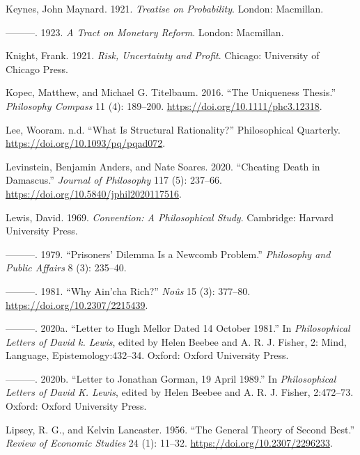 \documentclass[
  12pt,
  letterpaper,
  DIV=11,
  numbers=noendperiod]{scrreprt}
\newlength{\cslhangindent}
\newlength{\cslentryspacingunit} %
\newenvironment{CSLReferences}[2] %
 {%
  \setlength{\parindent}{0pt}
  \ifodd #1
  \let\oldpar\par
  \def\par{\hangindent=\cslhangindent\oldpar}
  \fi
  \setlength{\parskip}{#2\cslentryspacingunit}
 }%
 {}
\begin{document}
\begin{CSLReferences}{1}{0}
\leavevmode{}%
Keynes, John Maynard. 1921. \emph{Treatise on Probability}. London:
Macmillan.

\leavevmode{}%
---------. 1923. \emph{A Tract on Monetary Reform}. London: Macmillan.

\leavevmode{}%
Knight, Frank. 1921. \emph{Risk, Uncertainty and Profit}. Chicago:
University of Chicago Press.

\leavevmode{}%
Kopec, Matthew, and Michael G. Titelbaum. 2016. {``The Uniqueness
Thesis.''} \emph{Philosophy Compass} 11 (4): 189--200.
\url{https://doi.org/10.1111/phc3.12318}.

\leavevmode{}%
Lee, Wooram. n.d. {``What Is Structural Rationality?''} Philosophical
Quarterly. \url{https://doi.org/10.1093/pq/pqad072}.

\leavevmode{}%
Levinstein, Benjamin Anders, and Nate Soares. 2020. {``Cheating Death in
Damascus.''} \emph{Journal of Philosophy} 117 (5): 237--66.
\url{https://doi.org/10.5840/jphil2020117516}.

\leavevmode{}%
Lewis, David. 1969. \emph{Convention: A Philosophical Study}. Cambridge:
Harvard University Press.

\leavevmode{}%
---------. 1979. {``Prisoners' Dilemma Is a {N}ewcomb Problem.''}
\emph{Philosophy and Public Affairs} 8 (3): 235--40.

\leavevmode{}%
---------. 1981. {``Why Ain'cha Rich?''} \emph{No{û}s} 15 (3): 377--80.
\url{https://doi.org/10.2307/2215439}.

\leavevmode{}%
---------. 2020a. {``Letter to Hugh Mellor Dated 14 October 1981.''} In
\emph{Philosophical Letters of David k. Lewis}, edited by Helen Beebee
and A. R. J. Fisher, 2: Mind, Language, Epistemology:432--34. Oxford:
Oxford University Press.

\leavevmode{}%
---------. 2020b. {``Letter to Jonathan Gorman, 19 April 1989.''} In
\emph{Philosophical Letters of David {K}. Lewis}, edited by Helen Beebee
and A. R. J. Fisher, 2:472--73. Oxford: Oxford University Press.

\leavevmode{}%
Lipsey, R. G., and Kelvin Lancaster. 1956. {``The General Theory of
Second Best.''} \emph{Review of Economic Studies} 24 (1): 11--32.
\url{https://doi.org/10.2307/2296233}.


\end{CSLReferences}
\end{document}

